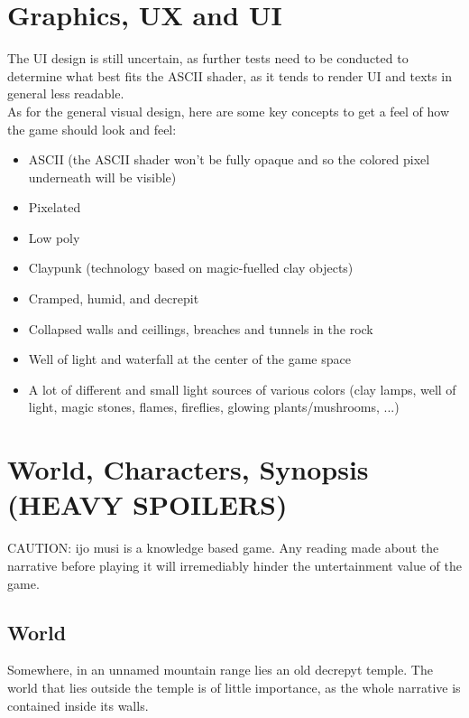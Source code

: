 \documentclass{scrartcl}
\begin{document}
	\section{Graphics, UX and UI}
		The UI design is still uncertain, as further tests need to be conducted to determine what best fits the ASCII shader, as it tends to render UI and texts in general less readable.\\
		As for the general visual design, here are some key concepts to get a feel of how the game should look and feel:
		\begin{itemize}
			\item ASCII (the ASCII shader won't be fully opaque and so the colored pixel underneath will be visible)
			\item Pixelated
			\item Low poly
			\item Claypunk (technology based on magic-fuelled clay objects)
			\item Cramped, humid, and decrepit
			\item Collapsed walls and ceillings, breaches and tunnels in the rock
			\item Well of light and waterfall at the center of the game space
			\item A lot of different and small light sources of various colors (clay lamps, well of light, magic stones, flames, fireflies, glowing plants/mushrooms, ...)
		\end{itemize}
	\section{World, Characters, Synopsis (HEAVY SPOILERS)}
		CAUTION: ijo musi is a knowledge based game. Any reading made about the narrative before playing it will irremediably hinder the untertainment value of the game.
		\subsection{World}
			Somewhere, in an unnamed mountain range lies an old decrepyt temple. The world that lies outside the temple is of little importance, as the whole narrative is contained inside its walls.
\end{document}
